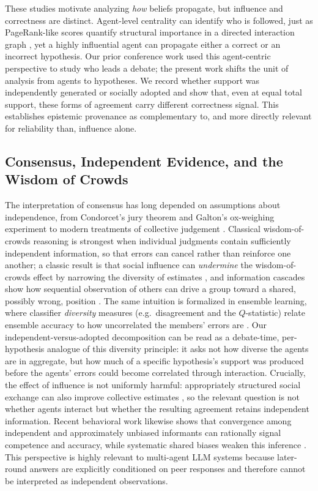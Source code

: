 These studies motivate analyzing \emph{how} beliefs propagate, but influence and correctness are distinct. Agent-level centrality can identify who is followed, just as PageRank-like scores quantify structural importance in a directed interaction graph \cite{page1998pagerank}, yet a highly influential agent can propagate either a correct or an incorrect hypothesis. Our prior conference work used this agent-centric perspective to study who leads a debate; the present work shifts the unit of analysis from agents to hypotheses. We record whether support was independently generated or socially adopted and show that, even at equal total support, these forms of agreement carry different correctness signal. This establishes epistemic provenance as complementary to, and more directly relevant for reliability than, influence alone.

\subsection{Consensus, Independent Evidence, and the Wisdom of Crowds}
\label{subsec:rw_crowds}

The interpretation of consensus has long depended on assumptions about independence, from Condorcet's jury theorem \cite{condorcet1785essai} and Galton's ox-weighing experiment \cite{galton1907vox} to modern treatments of collective judgement \cite{surowiecki2004wisdom}. Classical wisdom-of-crowds reasoning is strongest when individual judgments contain sufficiently independent information, so that errors can cancel rather than reinforce one another; a classic result is that social influence can \emph{undermine} the wisdom-of-crowds effect by narrowing the diversity of estimates \cite{lorenz2011crowd}, and information cascades show how sequential observation of others can drive a group toward a shared, possibly wrong, position \cite{bikhchandani1992cascades}. The same intuition is formalized in ensemble learning, where classifier \emph{diversity} measures (e.g.\ disagreement and the $Q$-statistic) relate ensemble accuracy to how uncorrelated the members' errors are \cite{kuncheva2003diversity}. Our independent-versus-adopted decomposition can be read as a debate-time, per-hypothesis analogue of this diversity principle: it asks not how diverse the agents are in aggregate, but how much of a specific hypothesis's support was produced before the agents' errors could become correlated through interaction. Crucially, the effect of influence is not uniformly harmful: appropriately structured social exchange can also improve collective estimates \cite{becker2017crowd}, so the relevant question is not whether agents interact but whether the resulting agreement retains independent information. Recent behavioral work likewise shows that convergence among independent and approximately unbiased informants can rationally signal competence and accuracy, while systematic shared biases weaken this inference \cite{pfander2025crowd}. This perspective is highly relevant to multi-agent LLM systems because later-round answers are explicitly conditioned on peer responses and therefore cannot be interpreted as independent observations.

